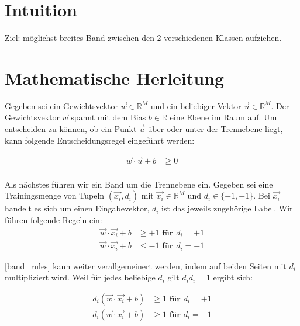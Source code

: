 \documentclass[a4paper,11pt,twoside]{scrreprt}
\begin{document}
\section{Intuition}
Ziel: möglichst breites Band zwischen den 2 verschiedenen Klassen aufziehen.

\section{Mathematische Herleitung}
Gegeben sei ein Gewichtsvektor $\vec{w} \in \mathbb{R}^{M}$ und ein beliebiger Vektor $\vec{u} \in \mathbb{R}^{M}$. Der Gewichtsvektor $\vec{w}$ spannt mit dem Bias $b \in \mathbb{R}$ eine Ebene im Raum auf. Um entscheiden zu können, ob ein Punkt $\vec{u}$ über oder unter der Trennebene liegt, kann folgende Entscheidungsregel eingeführt werden:

\begin{equation} \label{dec_rule}
    \begin{aligned}
    \vec{w} \cdot \vec{u} + b & \geq 0 \\
    \end{aligned}
\end{equation}

Als nächstes führen wir ein Band um die Trennebene ein. Gegeben sei eine Trainingsmenge von Tupeln $(\vec{x_{i}}, d_{i})$ mit $\vec{x_{i}} \in \mathbb{R}^{M}$ und $d_{i} \in \{-1, +1\}$. Bei $\vec{x_{i}}$ handelt es sich um einen Eingabevektor, $d_{i}$ ist das jeweils zugehörige Label. Wir führen folgende Regeln ein:
\begin{equation} \label{band_rules}
    \begin{aligned}
    \vec{w} \cdot \vec{x_{i}} + b & \geq +1 \textbf{ für $d_{i} = +1$} \\
    \vec{w} \cdot \vec{x_{i}} + b & \leq -1 \textbf{ für $d_{i} = -1$}
    \end{aligned}
\end{equation}

\autoref{band_rules} kann weiter verallgemeinert werden, indem auf beiden Seiten mit $d_{i}$ multipliziert wird. Weil für jedes beliebige $d_{i}$ gilt $d_{i} d_{i} = 1$ ergibt sich:

\begin{equation} \label{band_rule}
    \begin{aligned}
    d_{i} (\vec{w} \cdot \vec{x_{i}} + b) & \geq 1 \textbf{ für $d_{i} = +1$}\\
    d_{i} (\vec{w} \cdot \vec{x_{i}} + b) & \geq 1 \textbf{ für $d_{i} = -1$}\\
    \end{aligned}
\end{equation}
\end{document}
